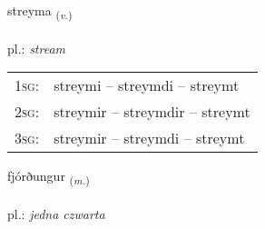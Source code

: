 \documentclass[frontgrid, backgrid]{flacards}\usepackage[]{graphicx}\usepackage[]{xcolor}
\begin{document}
\renewcommand{\flhead}{\vskip5pt \fboxsep=0pt {\small\bfseries\footnotesize Sagnorð | czasownik}}
\renewcommand{\fcfoot}{\vskip5pt \fboxsep=0pt \hspace{2pt}{\small\bfseries\footnotesize 3K}}

\renewcommand{\blhead}{\vskip5pt {\small\bfseries\footnotesize Sagnorð | czasownik }}
\renewcommand{\bcfoot}{\vskip5pt \hspace{2pt}{\small\bfseries\footnotesize 3K}}


{streyma \small{\textsubscript{(\textit{v.})}} \\[1ex] %
\textphonetic{[streiːma]} \\
pl.: \emph{stream} \\  [2ex]
\renewcommand*{\arraystretch}{0.8}
\begin{tabular}{p{1cm}l}
\textsc{1sg}: & streymi -- streymdi -- streymt \\ 
\textsc{2sg}: & streymir -- streymdir -- streymt \\ 
\textsc{3sg}: & streymir -- streymdi -- streymt \\ 
\end{tabular}
}

\renewcommand{\flhead}{\vskip5pt \fboxsep=0pt {\small\bfseries\footnotesize Nafnorð | rzeczownik}}
\renewcommand{\fcfoot}{\vskip5pt \fboxsep=0pt \hspace{2pt}{\small\bfseries\footnotesize 3K}}

\renewcommand{\blhead}{\vskip5pt {\small\bfseries\footnotesize Nafnorð | rzeczownik }}
\renewcommand{\bcfoot}{\vskip5pt \hspace{2pt}{\small\bfseries\footnotesize 3K}}


{fjórðungur \small{\textsubscript{(\textit{m.})}} \\[1ex] %
\textphonetic{[fjourðuŋkʏr]} \\
pl.: \emph{jedna czwarta} \\  [2ex]
\renewcommand*{\arraystretch}{0.8}
}
\end{document}
